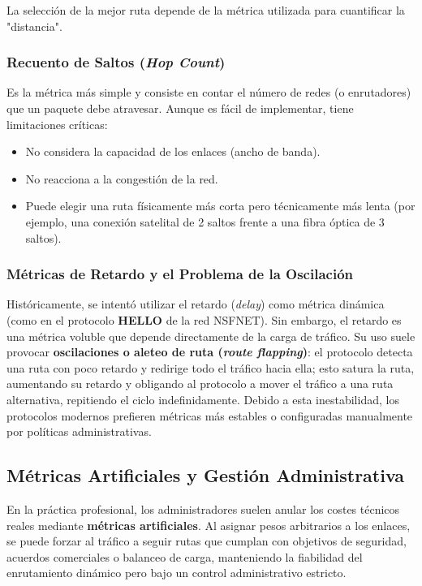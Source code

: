 La selección de la mejor ruta depende de la métrica utilizada para cuantificar la "distancia".

\subsubsection{Recuento de Saltos (\textit{Hop Count})}

Es la métrica más simple y consiste en contar el número de redes (o enrutadores) que un paquete debe atravesar. Aunque es fácil de implementar, tiene limitaciones críticas:
\begin{itemize}
    \item No considera la capacidad de los enlaces (ancho de banda).
    \item No reacciona a la congestión de la red.
    \item Puede elegir una ruta físicamente más corta pero técnicamente más lenta (por ejemplo, una conexión satelital de 2 saltos frente a una fibra óptica de 3 saltos).
\end{itemize}

\subsubsection{Métricas de Retardo y el Problema de la Oscilación}

Históricamente, se intentó utilizar el retardo (\textit{delay}) como métrica dinámica (como en el protocolo \textbf{HELLO} de la red NSFNET). Sin embargo, el retardo es una métrica voluble que depende directamente de la carga de tráfico. Su uso suele provocar \textbf{oscilaciones o aleteo de ruta (\textit{route flapping})}: el protocolo detecta una ruta con poco retardo y redirige todo el tráfico hacia ella; esto satura la ruta, aumentando su retardo y obligando al protocolo a mover el tráfico a una ruta alternativa, repitiendo el ciclo indefinidamente. Debido a esta inestabilidad, los protocolos modernos prefieren métricas más estables o configuradas manualmente por políticas administrativas.

\subsection{Métricas Artificiales y Gestión Administrativa}

En la práctica profesional, los administradores suelen anular los costes técnicos reales mediante \textbf{métricas artificiales}. Al asignar pesos arbitrarios a los enlaces, se puede forzar al tráfico a seguir rutas que cumplan con objetivos de seguridad, acuerdos comerciales o balanceo de carga, manteniendo la fiabilidad del enrutamiento dinámico pero bajo un control administrativo estricto.
